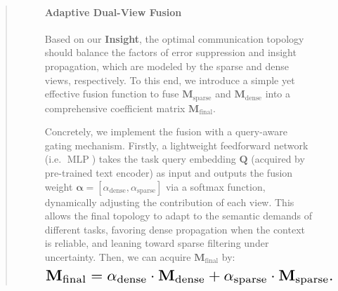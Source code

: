 \documentclass[11pt]{article}
\begin{document}
\begin{abstract}
\begin{figure}[ht!]

\paragraph{Adaptive Dual-View Fusion}
Based on our \textcolor{deepblue}{\textbf{Insight}}, the optimal communication topology should balance the factors of error suppression and insight propagation, which are modeled by the sparse and dense views, respectively. To this end, we introduce a simple yet effective fusion function to fuse $\mathbf{M}_{\text{sparse}}$ and $\mathbf{M}_{\text{dense}}$ into a comprehensive coefficient matrix $\mathbf{M}_{\text{final}}$.

Concretely, we implement the fusion with a query-aware gating mechanism. Firstly, a lightweight feedforward network (i.e. $\operatorname{MLP}$) takes the task query embedding $\mathbf{Q}$ (acquired by pre-trained text encoder) as input and outputs the fusion weight $\mathbf{\alpha} = [\alpha_{\text{dense}}, \alpha_{\text{sparse}}]$ via a softmax function, dynamically adjusting the contribution of each view.  This allows the final topology to adapt to the semantic demands of different tasks, favoring dense propagation when the context is reliable, and leaning toward sparse filtering under uncertainty. Then, we can acquire $\mathbf{M}_{\text{final}}$ by:
\begin{equation}
\resizebox{.85\hsize}{!}{$
\mathbf{M}_{\text{final}} = \alpha_{\text{dense}} \cdot \mathbf{M}_{\text{dense}} + \alpha_{\text{sparse}} \cdot \mathbf{M}_{\text{sparse}}.$}
\end{equation}


\end{figure}
\end{abstract}
\end{document}
